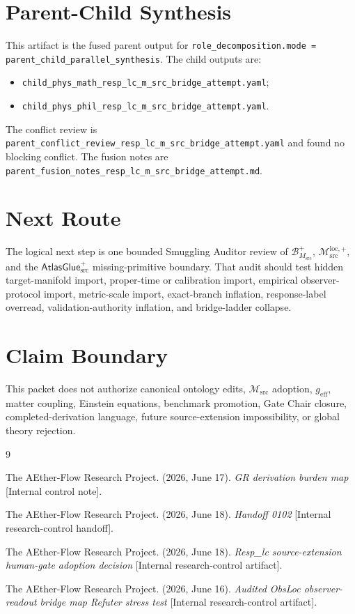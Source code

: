 \documentclass[11pt]{article}
\newcommand{\Msrc}{\mathcal{M}_{\mathrm{src}}}
\newcommand{\Mloc}{\mathcal{M}_{\mathrm{src}}^{\mathrm{loc},+}}
\newcommand{\geff}{g_{\mathrm{eff}}}
\newcommand{\BMsrc}{\mathcal{B}^{+}_{M_{\mathrm{src}}}}
\newcommand{\AtlasGlue}{\mathsf{AtlasGlue}_{\mathrm{src}}^{+}}
\begin{document}
\section{Parent-Child Synthesis}

This artifact is the fused parent output for
\texttt{role\_decomposition.mode = parent\_child\_parallel\_synthesis}.
The child outputs are:
\begin{itemize}
  \item \texttt{child\_phys\_math\_resp\_lc\_m\_src\_bridge\_attempt.yaml};
  \item \texttt{child\_phys\_phil\_resp\_lc\_m\_src\_bridge\_attempt.yaml}.
\end{itemize}
The conflict review is
\texttt{parent\_conflict\_review\_resp\_lc\_m\_src\_bridge\_attempt.yaml}
and found no blocking conflict. The fusion notes are
\texttt{parent\_fusion\_notes\_resp\_lc\_m\_src\_bridge\_attempt.md}.

\section{Next Route}

The logical next step is one bounded Smuggling Auditor review of
\(\BMsrc\), \(\Mloc\), and the \(\AtlasGlue\) missing-primitive
boundary. That audit should test hidden target-manifold import,
proper-time or calibration import, empirical observer-protocol import,
metric-scale import, exact-branch inflation, response-label overread,
validation-authority inflation, and bridge-ladder collapse.

\section{Claim Boundary}

This packet does not authorize canonical ontology edits, \(\Msrc\)
adoption, \(\geff\), matter coupling, Einstein equations, benchmark
promotion, Gate Chair closure, completed-derivation language, future
source-extension impossibility, or global theory rejection.

\begin{thebibliography}{9}

The AEther-Flow Research Project. (2026, June 17). \emph{GR derivation
burden map} [Internal control note].

The AEther-Flow Research Project. (2026, June 18). \emph{Handoff
0102} [Internal research-control handoff].

The AEther-Flow Research Project. (2026, June 18). \emph{Resp\_lc
source-extension human-gate adoption decision} [Internal
research-control artifact].

The AEther-Flow Research Project. (2026, June 16). \emph{Audited
ObsLoc observer-readout bridge map Refuter stress test} [Internal
research-control artifact].

\end{thebibliography}
\end{document}
